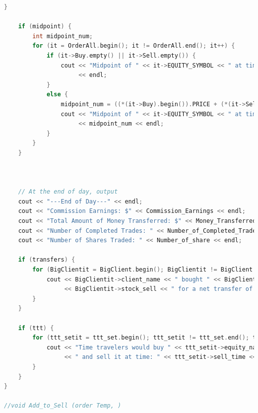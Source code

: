 \documentclass{article}
\begin{document}
\begin{lstlisting}[language=C++]
    }

    if (midpoint) {
        int midpoint_num;
        for (it = OrderAll.begin(); it != OrderAll.end(); it++) {
            if (it->Buy.empty() || it->Sell.empty()) {
                cout << "Midpoint of " << it->EQUITY_SYMBOL << " at time " << current_timestamp << " is undefined"
                     << endl;
            }
            else {
                midpoint_num = ((*(it->Buy).begin()).PRICE + (*(it->Sell).begin()).PRICE) / 2;
                cout << "Midpoint of " << it->EQUITY_SYMBOL << " at time " << current_timestamp << " is $"
                     << midpoint_num << endl;
            }
        }
    }



    // At the end of day, output
    cout << "---End of Day---" << endl;
    cout << "Commission Earnings: $" << Commission_Earnings << endl;
    cout << "Total Amount of Money Transferred: $" << Money_Transferred << endl;
    cout << "Number of Completed Trades: " << Number_of_Completed_Trades << endl;
    cout << "Number of Shares Traded: " << Number_of_share << endl;

    if (transfers) {
        for (BigClientit = BigClient.begin(); BigClientit != BigClient.end(); BigClientit++) {
            cout << BigClientit->client_name << " bought " << BigClientit->stock_buy << " and sold "
                 << BigClientit->stock_sell << " for a net transfer of $" << BigClientit->amount_traded << endl;
        }
    }

    if (ttt) {
        for (ttt_setit = ttt_set.begin(); ttt_setit != ttt_set.end(); ttt_setit++) {
            cout << "Time travelers would buy " << ttt_setit->equity_name << " at time: " << ttt_setit->buy_time
                 << " and sell it at time: " << ttt_setit->sell_time << endl;
        }
    }
}

//void Add_to_Sell (order Temp, )

\end{lstlisting}
\end{document}

